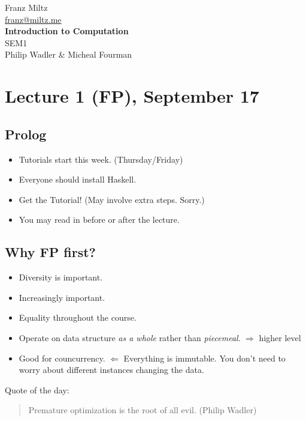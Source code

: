 \documentclass{article}
\begin{document}
\begin{titlepage}
    \begin{center}
        \LARGE Franz Miltz\\
        \url{franz@miltz.me}\\
        \vspace{5cm}
        \LARGE\textbf{Introduction to Computation}\\
        SEM1\\
        \vspace{1cm}
        Philip Wadler \& Micheal Fourman
    \end{center}
\end{titlepage}
\tableofcontents
\pagebreak
\section{Lecture 1 (FP), September 17}
\subsection{Prolog}
\begin{itemize}
    \item Tutorials start this week. (Thursday/Friday)
    \item Everyone should install Haskell.
    \item Get the Tutorial! (May involve extra steps. Sorry.)
    \item You may read in before or after the lecture.
\end{itemize}
\subsection{Why FP first?}
\begin{itemize}
    \item Diversity is important.
    \item Increasingly important.
    \item Equality throughout the course.
    \item Operate on data structure \emph{as a whole} rather than \emph{piecemeal}. $\Rightarrow$ higher level
    \item Good for councurrency.
    $\Leftarrow$ Everything is immutable.
    You don't need to worry about different instances changing the data.
\end{itemize}
Quote of the day:
\begin{quotation}
    Premature optimization is the root of all evil.
    (Philip Wadler)
\end{quotation}
\end{document}
